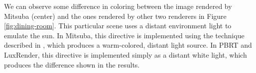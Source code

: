 We can observe some difference in coloring between the image rendered by Mitsuba 
(center) and the ones rendered by other two renderers in Figure 
\ref{fig:dining-room}. This particular scene uses a distant environment light to 
emulate the sun. In Mitsuba, this directive is implemented using the technique 
described in \cite{Preetham}, which produces a warm-colored, distant light source. In 
PBRT and LuxRender, this directive is implemented simply as a distant white 
light, which produces the difference shown in the results.

\begin{figure}
\centering

\end{figure}
